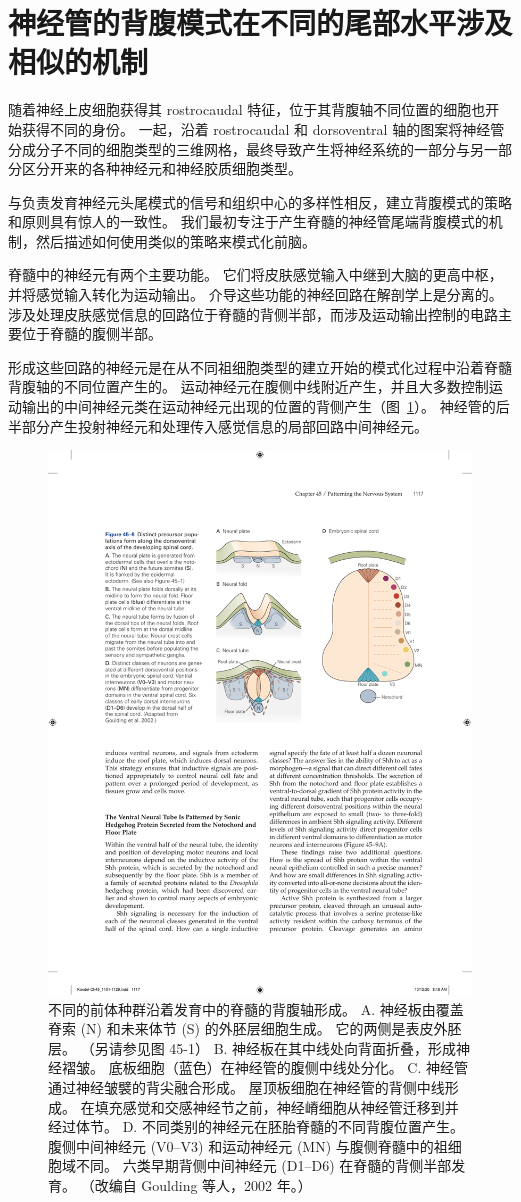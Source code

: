 \section{神经管的背腹模式在不同的尾部水平涉及相似的机制}

随着神经上皮细胞获得其 rostrocaudal 特征，位于其背腹轴不同位置的细胞也开始获得不同的身份。
一起，沿着 rostrocaudal 和 dorsoventral 轴的图案将神经管分成分子不同的细胞类型的三维网格，最终导致产生将神经系统的一部分与另一部分区分开来的各种神经元和神经胶质细胞类型。


与负责发育神经元头尾模式的信号和组织中心的多样性相反，建立背腹模式的策略和原则具有惊人的一致性。
我们最初专注于产生脊髓的神经管尾端背腹模式的机制，然后描述如何使用类似的策略来模式化前脑。


脊髓中的神经元有两个主要功能。
它们将皮肤感觉输入中继到大脑的更高中枢，并将感觉输入转化为运动输出。
介导这些功能的神经回路在解剖学上是分离的。
涉及处理皮肤感觉信息的回路位于脊髓的背侧半部，而涉及运动输出控制的电路主要位于脊髓的腹侧半部。


形成这些回路的神经元是在从不同祖细胞类型的建立开始的模式化过程中沿着脊髓背腹轴的不同位置产生的。
运动神经元在腹侧中线附近产生，并且大多数控制运动输出的中间神经元类在运动神经元出现的位置的背侧产生（图~\ref{fig:45_8}）。
神经管的后半部分产生投射神经元和处理传入感觉信息的局部回路中间神经元。


\begin{figure}[htbp]
	\centering
	\includegraphics[width=0.7\linewidth]{chap45/fig_45_8}
	\caption{不同的前体种群沿着发育中的脊髓的背腹轴形成。 A. 神经板由覆盖脊索 (N) 和未来体节 (S) 的外胚层细胞生成。 它的两侧是表皮外胚层。 （另请参见图 45-1） B. 神经板在其中线处向背面折叠，形成神经褶皱。 底板细胞（蓝色）在神经管的腹侧中线处分化。 C. 神经管通过神经皱襞的背尖融合形成。 屋顶板细胞在神经管的背侧中线形成。 在填充感觉和交感神经节之前，神经嵴细胞从神经管迁移到并经过体节。 D. 不同类别的神经元在胚胎脊髓的不同背腹位置产生。 腹侧中间神经元 (V0–V3) 和运动神经元 (MN) 与腹侧脊髓中的祖细胞域不同。 六类早期背侧中间神经元 (D1–D6) 在脊髓的背侧半部发育。 （改编自 Goulding 等人，2002 年。）}
	\label{fig:45_8}
\end{figure}


